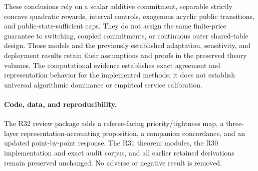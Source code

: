 \documentclass[11pt,letterpaper]{article}
\theoremstyle{definition}\newtheorem{assumption}[theorem]{Assumption}
\begin{document}
These conclusions rely on a scalar additive commitment, separable strictly concave quadratic rewards, interval controls, exogenous acyclic public transitions, and public-state-sufficient caps. They do not assign the same finite-price guarantee to switching, coupled commitments, or continuous outer shared-table design. Those models and the previously established adaptation, sensitivity, and deployment results retain their assumptions and proofs in the preserved theory volumes. The computational evidence establishes exact agreement and representation behavior for the implemented methods; it does not establish universal algorithmic dominance or empirical service calibration.

\paragraph{Code, data, and reproducibility.}
The R32 review package adds a referee-facing priority/tightness map, a three-layer representation-accounting proposition, a companion concordance, and an updated point-by-point response. The R31 theorem modules, the R30 implementation and exact audit corpus, and all earlier retained derivations remain preserved unchanged. No adverse or negative result is removed.


\clearpage

\end{document}
